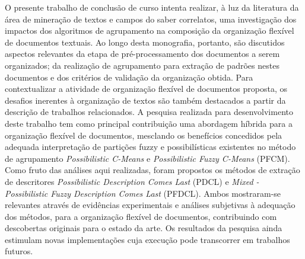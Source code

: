 O presente trabalho de conclusão de curso intenta realizar, à luz da literatura da área de mineração
de textos e campos do saber correlatos, uma investigação dos impactos dos algoritmos de agrupamento
na composição da organização flexível de documentos textuais. Ao longo desta monografia, portanto,
são discutidos aspectos relevantes da etapa de pré-processamento dos documentos a serem organizados; da realização de agrupamento para extração de padrões nestes documentos e dos critérios de validação da organização obtida. Para contextualizar a atividade de organização flexível de documentos proposta, os
desafios inerentes à organização de textos são também destacados a partir da descrição de trabalhos relacionados. A pesquisa realizada para desenvolvimento deste trabalho tem como principal contribuição uma abordagem híbrida para a organização flexível de documentos, mesclando os benefícios concedidos pela adequada
interpretação de partições fuzzy e possibilísticas existentes no método de agrupamento {\it Possibilistic
C-Means} e {\it Possibilistic Fuzzy C-Means} (PFCM). Como fruto das análises aqui
realizadas, foram propostos os métodos de extração de descritores {\it Possibilistic Description Comes
Last} (PDCL) e {\it Mixed - Possibilistic Fuzzy Description Comes Last} (PFDCL). Ambos mostraram-se
relevantes através de evidências experimentais e análises subjetivas à adequação dos métodos, para a
organização flexível de documentos, contribuindo com descobertas originais para o estado da arte. Os resultados da pesquisa ainda estimulam novas implementações cuja execução pode
transcorrer em trabalhos futuros.

